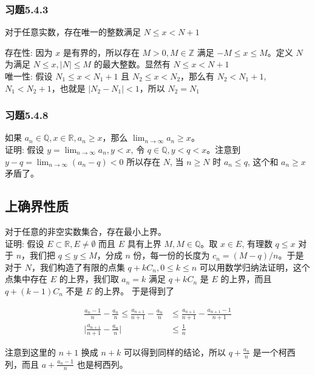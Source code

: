 \subsubsection{习题5.4.3}

对于任意实数，存在唯一的整数满足 $N \le x < N + 1$

存在性: 因为 $x$ 是有界的，所以存在 $M > 0, M \in \mathbb{Z}$ 满足 $ -M \le x \le M $。定义 $ N $ 为满足 $N \le x, \lvert N \rvert \le M$ 的最大整数。显然有 $ N \le x < N + 1 $\\

唯一性: 假设 $N_1 \le x < N_1 + 1$ 且 $N_2 \le x < N_2$，那么有 $N_2 < N_1 + 1$, $N_1 < N_2 + 1$，也就是 $\lvert N_2 - N_1 \rvert < 1$，所以 $N_2 = N_1$


\subsubsection{习题5.4.8}
如果 $a_n \in \mathbb{Q}, x \in \mathbb{R},  a_n \ge x $，那么 $\lim_{n \to \infty} a_n \ge x$。 \\
证明: 假设 $y = \lim_{n \to \infty}a_n, y < x$, 令 $q \in \mathbb{Q}, y < q < x$。注意到 $y - q = \lim_{n \to \infty} (a_n -q ) < 0$
所以存在 $N$, 当 $n \ge N$ 时 $a_n \le q$, 这个和 $a_n \ge x$ 矛盾了。

\subsection{上确界性质}

对于任意的非空实数集合，存在最小上界。\\

证明: 假设 $E \subset \mathbb{R}, E \ne \emptyset $ 而且 $ E $ 具有上界 $M, M \in \mathbb{Q}$。取 $x \in E$, 有理数 $q \le x$
对于 $n$，我们把 $q \le y \le M$，分成 $n$ 份，每一份的长度为 $c_n = (M -q) / n$。于是对于 $N$，我们构造了有限的点集 $q + kC_n, 0 \le k \le n $
可以用数学归纳法证明，这个点集中存在 $E$ 的上界，我们取 $a_n = k $ 满足 $q + kC_n$ 是 $E$ 的上界，而且 $q + (k-1)C_n $ 不是 $E$ 的上界。
于是得到了

\begin{align*}
\frac{a_{n} - 1}{n} - \frac{a_n}{n} \le \frac{a_{n+1}}{n+1} - \frac{a_n}{n} & \le \frac{a_{n+1}}{n+1} - \frac{a_{n+1} - 1}{n+1} \\
\lvert \frac{a_{n+1}}{n+1} - \frac{a_n}{n} \rvert & \le \frac{1}{n}
\end{align*}

注意到这里的 $n+1$ 换成 $n + k$ 可以得到同样的结论，所以 $q + \frac{a_n}{n}$ 是一个柯西列，而且 $a + \frac{a_n - 1}{n}$ 也是柯西列。

